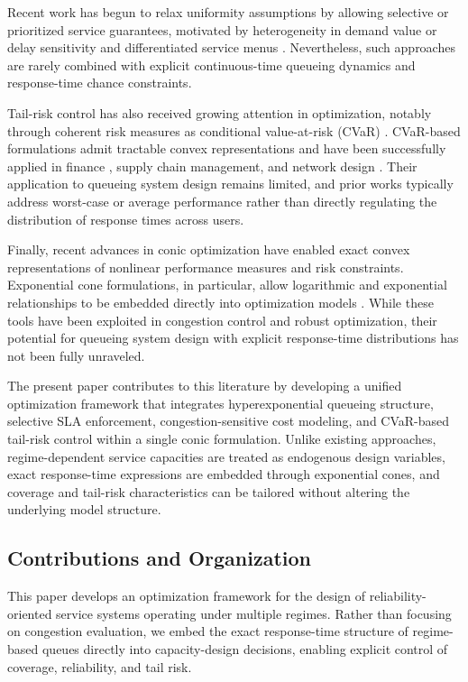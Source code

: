 \documentclass[letter,11pt, reqno]{amsart}
\begin{document}
Recent work has begun to relax uniformity assumptions by allowing selective or
prioritized service guarantees, motivated by heterogeneity in demand value or
delay sensitivity and differentiated service menus
\citep{Bertsimas2018Fairness,Caldentey2025designing,Daskin2013}.
Nevertheless, such approaches are rarely combined with explicit continuous-time
queueing dynamics and response-time chance constraints.

Tail-risk control has also received growing attention in optimization, notably
through coherent risk measures as conditional value-at-risk (CVaR)
\citep{RockafellarUryasev2000,RockafellarUryasev2002}.
CVaR-based formulations admit tractable convex representations and have been
successfully applied in finance \citep{Cesarone2025}, supply chain management, and network design
\citep{Ogryczak2003,puerto2017revisiting}.
Their application to queueing system design remains limited, and prior works
typically address worst-case or average performance rather than directly
regulating the distribution of response times across users.

Finally, recent advances in conic optimization have enabled exact convex
representations of nonlinear performance measures and risk constraints.
Exponential cone formulations, in particular, allow logarithmic and exponential
relationships to be embedded directly into optimization models
\citep{BenTalNemirovski2001,boydvandenberghe2004,Chares2009}.
While these tools have been exploited in congestion control and robust
optimization, their potential for queueing system design with explicit
response-time distributions has not been fully unraveled.

The present paper contributes to this literature by developing a unified
optimization framework that integrates hyperexponential queueing structure,
selective SLA enforcement, congestion-sensitive cost modeling, and CVaR-based
tail-risk control within a single conic formulation.
Unlike existing approaches, regime-dependent service capacities are treated as
endogenous design variables, exact response-time expressions are embedded through
exponential cones, and coverage and tail-risk characteristics can be tailored
without altering the underlying model structure.


\subsection{Contributions and Organization}

This paper develops an optimization framework for the design of
reliability-oriented service systems operating under multiple regimes.
Rather than focusing on congestion evaluation, we embed the exact
response-time structure of regime-based queues directly into
capacity-design decisions, enabling explicit control of coverage,
reliability, and tail risk.
\end{document}
